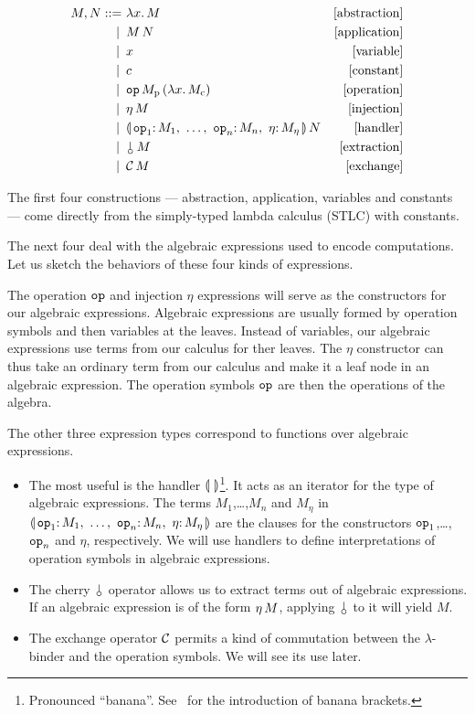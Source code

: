 \documentclass{llncs}
\begin{document}
\begin{align*}
  M, N ::= &\ \lam{x}{M} & \mbox{[abstraction]} \\
   | \, &\ \ap{M}{N} & \mbox{[application]} \\
   | \, &\ x & \mbox{[variable]} \\
   | \, &\ c & \mbox{[constant]} \\
   | \, &\ \app{\op{op}}{M_{\mathrm{p}}}{(\lam{x}{M_{\mathrm{c}}})} & \mbox{[operation]} \\
   | \, &\ \ap{\eta}{M} & \mbox{[injection]} \\
   | \, &\ \ap{\cdbanana}{N} & \mbox{[handler]} \\
   | \, &\ \ap{\cherry}{M} & \mbox{[extraction]} \\
   | \, &\ \ap{\CC}{M} & \mbox{[exchange]} 
\end{align*}

The first four constructions --- abstraction, application, variables and
constants --- come directly from the simply-typed lambda calculus (STLC)
with constants.

The next four deal with the algebraic expressions used to encode
computations. Let us sketch the behaviors of these four kinds of
expressions.

The operation $\mathtt{op}$ and injection $\eta$ expressions will serve as the
constructors for our algebraic expressions. Algebraic expressions are
usually formed by operation symbols and then variables at the
leaves. Instead of variables, our algebraic expressions use terms from our
calculus for ther leaves. The $\eta$ constructor can thus take an ordinary
term from our calculus and make it a leaf node in an algebraic
expression. The operation symbols $\mathtt{op}$ are then the operations of the
algebra.

The other three expression types correspond to functions over algebraic
expressions.
\begin{itemize}
\item The most useful is the handler $\llparenthesis \,  \, \rrparenthesis$\footnote{Pronounced
  ``banana''. See~\cite{meijer1991functional} for the introduction of
  banana brackets.}. It acts as an iterator for the type of algebraic
  expressions. The terms $M_1$,\ldots,$M_n$ and $M_\eta$ in $\cdbanana$ are
  the clauses for the constructors $\mathtt{op}_1$,\ldots,$\mathtt{op}_n$ and
  $\eta$, respectively. We will use handlers to define interpretations of
  operation symbols in algebraic expressions.
\item The cherry $\cherry$ operator allows us to extract terms out of
  algebraic expressions. If an algebraic expression is of the form
  $\eta\,M$, applying $\cherry$ to it will yield $M$.
\item The exchange operator $\mathcal{C}$ permits a kind of commutation between the
  $\lambda$-binder and the operation symbols. We will see its use later.
\end{itemize}
\end{document}
